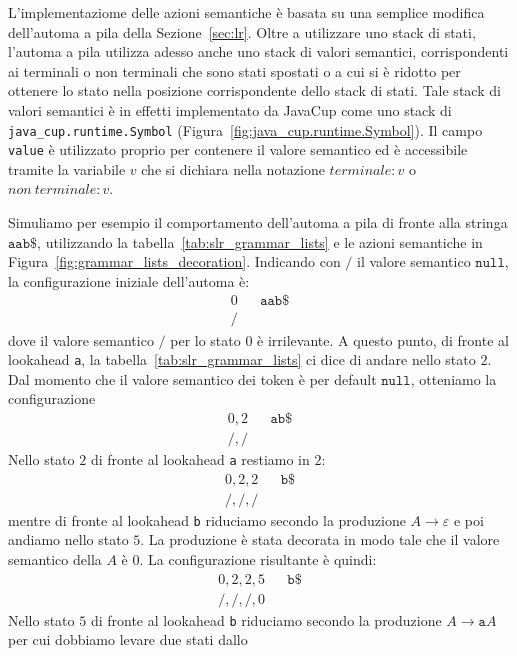 L'implementaziome delle azioni semantiche \`e basata su una semplice
modifica dell'automa a pila della Sezione~\ref{sec:lr}. Oltre a utilizzare
uno stack di stati, l'automa a pila utilizza adesso anche uno stack di
valori semantici, corrispondenti ai terminali o non terminali che sono
stati spostati o a cui si \`e ridotto per ottenere lo stato
nella posizione corrispondente dello stack di stati.
Tale stack di valori semantici \`e in effetti implementato da JavaCup come
uno stack di \texttt{java\_cup.runtime.Symbol}
(Figura~\ref{fig:java_cup.runtime.Symbol}). Il campo \texttt{value} \`e
utilizzato proprio per contenere il valore semantico ed \`e accessibile
tramite la variabile $v$ che si dichiara nella notazione
$\mathit{terminale}:v$ o $\mathit{non\ terminale}:v$.

Simuliamo per esempio
il comportamento dell'automa a pila di fronte alla stringa
$\mathtt{aab\$}$, utilizzando la tabella~\eqref{tab:slr_grammar_lists} e le
azioni semantiche in Figura~\ref{fig:grammar_lists_decoration}.
Indicando con $/$ il valore semantico $\mathtt{null}$, la
configurazione iniziale dell'automa \`e:
%
\begin{align*}
  0 & & \mathtt{aab\$}\\
  / & &
\end{align*}
%
dove il valore semantico $/$ per lo stato $0$ \`e irrilevante. A questo
punto, di fronte al lookahead \texttt{a}, la
tabella~\eqref{tab:slr_grammar_lists} ci dice di andare nello stato $2$.
Dal momento che il valore semantico dei token \`e per default
$\mathtt{null}$, otteniamo la configurazione
%
\begin{align*}
  0,2 & & \mathtt{ab\$}\\
  /,/ & &
\end{align*}
%
Nello stato $2$ di fronte al lookahead \texttt{a} restiamo in $2$:
%
\begin{align*}
  0,2,2 & & \mathtt{b\$}\\
  /,/,/ & &
\end{align*}
%
mentre di fronte al lookahead \texttt{b} riduciamo secondo la
produzione $A\to\varepsilon$ e poi andiamo nello stato $5$.
La produzione \`e stata decorata in modo tale che il
valore semantico della $A$ \`e $0$. La configurazione risultante \`e quindi:
%
\begin{align*}
  0,2,2,5 & & \mathtt{b\$}\\
  /,/,/,0 & &
\end{align*}
%
Nello stato $5$ di fronte al lookahead \texttt{b} riduciamo secondo
la produzione $A\to\mathtt{a}A$ per cui dobbiamo levare due stati dallo

